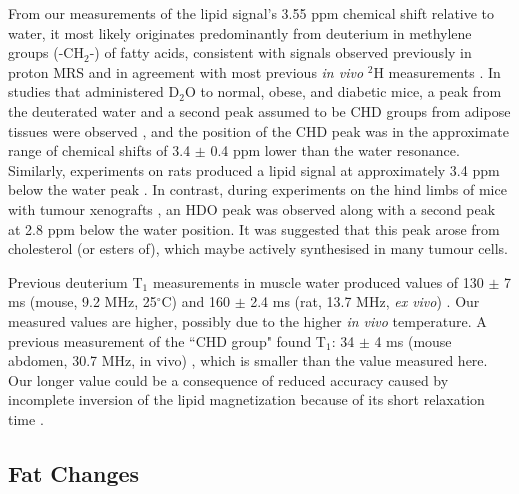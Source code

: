 From our measurements of the lipid signal’s 3.55 ppm chemical shift relative to water, it most likely originates predominantly from deuterium in methylene groups (-CH$_2$-) of fatty acids, consistent with signals observed previously in proton \ac{MRS} \cite{Ren2008CompositionTesla} and in agreement with most previous \textit{in vivo} $^2$H measurements \cite{Brereton1989TheMice}. In studies that administered D$_2$O to normal, obese, and diabetic mice, a peak from the deuterated water and a second peak assumed to be CHD groups from adipose tissues were observed \cite{Brereton1986PreliminarySpectroscopy, Brereton1989TheMice}, and the position of the CHD peak was in the approximate range of chemical shifts of 3.4 $\pm$ 0.4 ppm lower than the water resonance. Similarly, experiments on rats produced a lipid signal at approximately 3.4 ppm below the water peak \cite{Kosenkov2018TheMice}. In contrast, during experiments on the hind limbs of mice with tumour xenografts \cite{Assmann2020InCholesterol}, an \ac{HDO} peak was observed along with a second peak at 2.8 ppm below the water position. It was suggested \cite{Assmann2020InCholesterol} that this peak arose from cholesterol (or esters of), which maybe actively synthesised in many tumour cells.

Previous deuterium T$_1$ measurements in muscle water produced values of 130 $\pm$ 7 ms (mouse, 9.2 MHz, 25$^\circ$C) and 160 $\pm$ 2.4 ms (rat, 13.7 MHz, \textit{ex vivo}) \cite{Block1987COMMUNICATIONSTissues}. Our measured values are higher, possibly due to the higher \textit{in vivo} temperature. A previous measurement of the ``CHD group" found T$_1$: 34 $\pm$ 4 ms (mouse abdomen, 30.7 MHz, in vivo) \cite{Brereton1986PreliminarySpectroscopy}, which is smaller than the value measured here. Our longer value could be a consequence of reduced accuracy caused by incomplete inversion of the lipid magnetization because of its short relaxation time \cite{Pfaff2017PredictingPulses}.


\subsection{Fat Changes}


